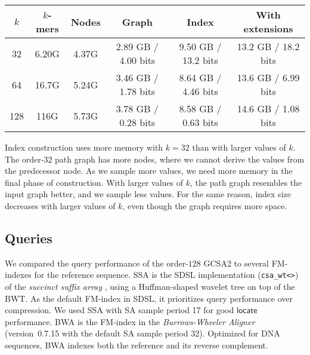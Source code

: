 \documentclass[twoside,leqno,twocolumn]{article}
\newcommand{\locate}{\ensuremath{\mathsf{locate}}}
\newcommand{\kmer}[1]{$#1$\nobreakdash-mer}
\newcommand{\orderk}[1]{order\nobreakdash-$#1$}
\newcommand{\bvOUT}{\ensuremath{\mathsf{OUT}}}
\begin{document}
\begin{table*}[t]
\begin{center}
\begin{tabular}{c|cc|c|c|c}
\hline
$k$ & \textbf{\kmer{k}s} & \textbf{Nodes} & \textbf{Graph} & \textbf{Index} & \textbf{With extensions} \\
\hline
 32 & 6.20G & 4.37G & 2.89 GB / 4.00 bits & 9.50 GB / 13.2 bits & 13.2 GB / 18.2 bits \\
 64 & 16.7G & 5.24G & 3.46 GB / 1.78 bits & 8.64 GB / 4.46 bits & 13.6 GB / 6.99 bits \\
128 &  116G & 5.73G & 3.78 GB / 0.28 bits & 8.58 GB / 0.63 bits & 14.6 GB / 1.08 bits \\
\hline
\end{tabular}
\caption{GCSA2 index sizes. Order of the path graph; number of \kmer{k}s and nodes in the path graph in billions; index size in gigabytes and in bits per \kmer{k} for the graph ($B_{c}$ and $\bvOUT$), the index (the graph, $B_{S}$, $B_{V}$, and $V_{S}$), and the index with the extensions from Appendix~\ref{appendix:extensions}.}\label{table:indexes}
\end{center}
\end{table*}

Index construction uses more memory with $k = 32$ than with larger values of $k$. The \orderk{32} path graph has more nodes, where we cannot derive the values from the predecessor node. As we sample more values, we need more memory in the final phase of construction. With larger values of $k$, the path graph resembles the input graph better, and we sample less values. For the same reason, index size decreases with larger values of $k$, even though the graph requires more space.

\subsection{Queries}

We compared the query performance of the \orderk{128} GCSA2 to several FM-indexes for the reference sequence. SSA is the SDSL implementation (\texttt{csa\_wt<>}) of the \emph{succinct suffix array} \cite{Maekinen2005}, using a Huffman-shaped wavelet tree on top of the BWT. As the default FM-index in SDSL, it prioritizes query performance over compression. We used SSA with SA sample period 17 for good $\locate$ performance. BWA is the FM-index in the \emph{Burrows-Wheeler Aligner} \cite{Li2009} (version~0.7.15 with the default SA sample period 32). Optimized for DNA sequences, BWA indexes both the reference and its reverse complement.
\end{document}
